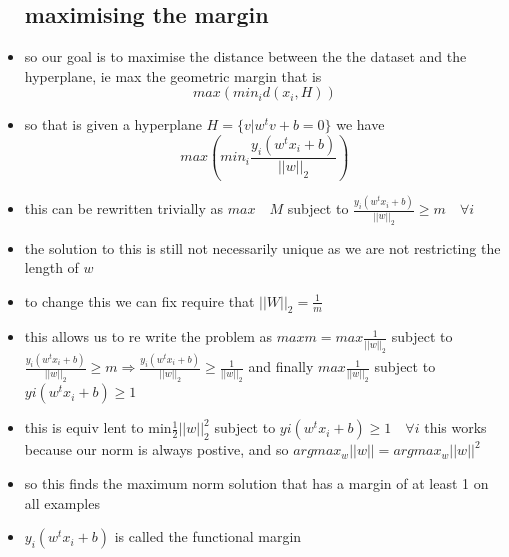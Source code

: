 \documentclass{article}
\begin{document}
\begin{itemize}
\subsection{maximising the margin}
\item so our goal is to maximise the distance between the the dataset and the hyperplane, ie max the geometric margin that is $$max (min_{i}d(x_i,H))$$
\item so that is given a hyperplane $H=\{v|w^{t}v+b=0\}$ we have $$max(min_{i}\frac{y_{i}(w^{t}x_i+b)}{||w||_{2}})$$
\item this can be rewritten trivially as $max\quad M $ subject to $\frac{y_{i}(w^{t}x_i+b)}{||w||_{2}}\geq m\quad \forall i$
\item the solution to this is still not necessarily unique as we are not restricting the length of $w$
\item to change this we can fix require that $||W||_{2}=\frac{1}{m}$
\item this allows us to re write the problem as $max m= max \frac{1}{||w||_{2}}$ subject to $\frac{y_{i}(w^{t}x_i+b)}{||w||_{2}}\geq m\Rightarrow \frac{y_{i}(w^{t}x_i+b)}{||w||_{2}}\geq \frac{1}{||w||_{2}}$ and finally $max \frac{1}{||w||_{2}}$ subject to $yi(w^{t}x_i+b)\geq 1$
\item this is equiv lent to min$\frac{1}{2}||w||_{2}^{2}$ subject to $yi(w^{t}x_i+b)\geq 1\quad \forall i$ this works because our norm is always postive, and so  $argmax_w||w||=argmax_w||w||^2$
\item so this finds the maximum norm solution that has a margin of at least 1 on all examples
\item $y_{i}(w^{t}x_i+b)$ is called the functional margin 

\end{itemize}
\end{document}
